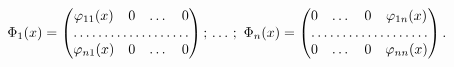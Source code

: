 $$ 


\Phi_1(x)= 


\begin{pmatrix} 


\varphi_{11}(x) & 0 & \dots & 0 \\ 


\hdotsfor{4} \\ 


\varphi_{n1}(x) & 0 & \dots & 0 


\end{pmatrix} 


;\,\dotsc;\ \Phi_n(x)= 


\begin{pmatrix} 


0 & \dots & 0 & \varphi_{1n}(x) \\ 


\hdotsfor{4} \\ 


0 & \dots & 0 & \varphi_{nn}(x) 


\end{pmatrix} 


. 


$$ 


 


